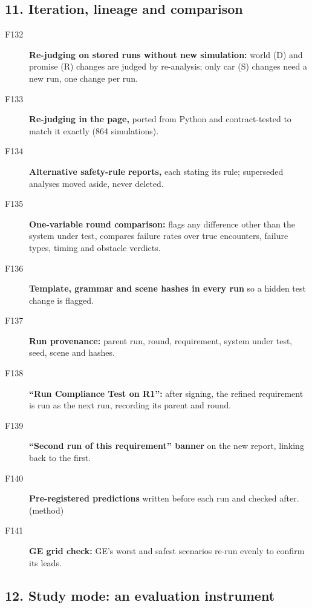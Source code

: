 \subsection*{11. Iteration, lineage and comparison}

\begin{description}
\item[F132] \textbf{Re-judging on stored runs without new simulation:} world (D) and promise (R) changes are judged by re-analysis; only car (S) changes need a new run, one change per run. \tagnew{}
\item[F133] \textbf{Re-judging in the page,} ported from Python and contract-tested to match it exactly (864 simulations). \tagnew{}
\item[F134] \textbf{Alternative safety-rule reports,} each stating its rule; superseded analyses moved aside, never deleted. \tagnew{}
\item[F135] \textbf{One-variable round comparison:} flags any difference other than the system under test, compares failure rates over true encounters, failure types, timing and obstacle verdicts. \tagnew{} 
\item[F136] \textbf{Template, grammar and scene hashes in every run} so a hidden test change is flagged. \tagnew{}
\item[F137] \textbf{Run provenance:} parent run, round, requirement, system under test, seed, scene and hashes. 
\item[F138] \textbf{``Run Compliance Test on R1'':} after signing, the refined requirement is run as the next run, recording its parent and round. \tagnew{} 
\item[F139] \textbf{``Second run of this requirement'' banner} on the new report, linking back to the first. \tagnew{}
\item[F140] \textbf{Pre-registered predictions} written before each run and checked after. \tagnew{} (method)
\item[F141] \textbf{GE grid check:} GE's worst and safest scenarios re-run evenly to confirm its leads. \tagnew{}
\end{description}

\subsection*{12. Study mode: an evaluation instrument}


